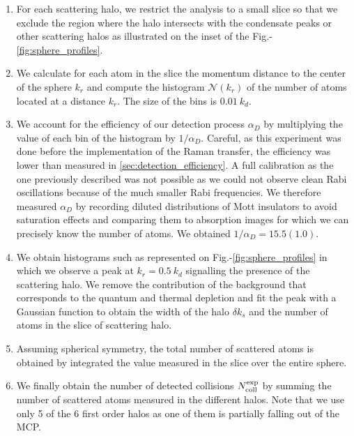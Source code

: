 \begin{enumerate}
    \item For each scattering halo, we restrict the analysis to a small slice so that we exclude the region where the halo intersects with the condensate peaks or other scattering halos as illustrated on the inset of the Fig.-\ref{fig:sphere_profiles}. 
    \item We calculate for each atom in the slice the momentum distance to the center of the sphere $k_r$ and compute the histogram $\mathcal{N}(k_r)$ of the number of atoms located at a distance $k_r$. The size of the bins is $0.01 \ k_d$.
    \item We account for the efficiency of our detection process $\alpha_D$ by multiplying the value of each bin of the histogram by $1/\alpha_D$. Careful, as this experiment was done before the implementation of the Raman transfer, the efficiency was lower than measured in \ref{sec:detection_efficiency}. A full calibration as the one previously described was not possible as we could not observe clean Rabi oscillations because of the much smaller Rabi frequencies. We therefore measured $\alpha_D$ by recording diluted distributions of Mott insulators to avoid saturation effects and comparing them to absorption images for which we can precisely know the number of atoms. We obtained $1/\alpha_D=15.5(1.0)$.
    \item We obtain histograms such as represented on Fig.-\ref{fig:sphere_profiles} in which we observe a peak at $k_r=0.5 \ k_d$ signalling the presence of the scattering halo. We remove the contribution of the background that corresponds to the quantum and thermal depletion and fit the peak with a Gaussian function to obtain the width of the halo $\delta k_s$ and the number of atoms in the slice of scattering halo.
    \item Assuming spherical symmetry, the total number of scattered atoms is obtained by integrated the value measured in the slice over the entire sphere. 
    \item We finally obtain the number of detected collisions $N_{\rm{coll}}^{\rm{exp}}$ by summing the number of scattered atoms measured in the different halos. Note that we use only 5 of the 6 first order halos as one of them is partially falling out of the MCP. 
\end{enumerate}

